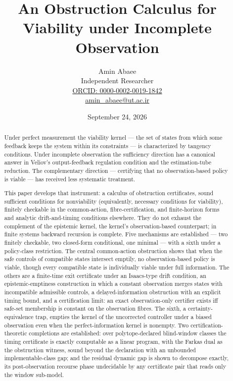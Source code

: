 \documentclass[10pt,twocolumn]{article}
\theoremstyle{definition}
\begin{document}
\title{An Obstruction Calculus for Viability under Incomplete Observation}
\author{Amin Abaee\\[0.35em]
{\small Independent Researcher}\\[0.55em]
{\small\href{https://orcid.org/0000-0002-0019-1842}{ORCID: 0000-0002-0019-1842}}\\[0.3em]
{\small\href{mailto:amin\_abaee@ut.ac.ir}{amin\_abaee@ut.ac.ir}}}
\date{September 24, 2026}
\maketitle

\begin{abstract}

Under perfect measurement the viability kernel --- the set of states
from which some feedback keeps the system within its constraints --- is
characterized by tangency conditions. Under incomplete observation the
sufficiency direction has a canonical answer in Veliov's
output-feedback regulation condition and the estimation-tube reduction.
The complementary direction --- certifying that no observation-based
policy is viable --- has received less systematic treatment.

This paper develops that instrument: a calculus of obstruction
certificates, sound sufficient conditions for nonviability (equivalently, necessary conditions for viability), finitely
checkable in the common-action, fibre-certification, and finite-horizon forms and analytic drift-and-timing conditions elsewhere. They do not exhaust the complement of the epistemic kernel, the kernel's observation-based counterpart; in finite systems backward recursion is complete. Five mechanisms are established --- two finitely checkable, two
closed-form conditional, one minimal --- with a sixth under a
policy-class restriction. The central common-action obstruction shows
that when the safe controls of compatible states intersect emptily, no
observation-based policy is viable, though every compatible state is
individually viable under full information. The others are a finite-time
exit certificate under an Isaacs-type drift condition, an
epistemic-emptiness construction in which a constant observation merges
states with incompatible admissible controls, a delayed-information
obstruction with an explicit timing bound, and a certification limit:
an exact observation-only certifier exists iff safe-set
membership is constant on the observation fibres. The sixth, a
certainty-equivalence trap, empties the kernel of the uncorrected controller under a biased
observation even when the perfect-information kernel is nonempty.
Two certification-theoretic completions are established: over polytope-declared
blind-window classes the timing certificate is exactly computable as a linear
program, with the Farkas dual as the obstruction witness, sound beyond the
declaration with an unbounded implementable-class gap; and the residual dynamic
gap is shown to decompose exactly, its post-observation recourse phase
undecidable by any certificate pair that reads only the window sub-model.


\end{abstract}
\end{document}
